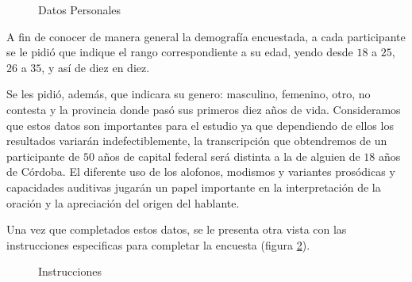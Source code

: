 \begin{figure}[htp]
\begin{center}
\end{center}
\caption{Datos Personales}
\label{personalData}
\end{figure}

A fin de conocer de manera general la demografía encuestada, a cada participante se le pidió que indique el rango correspondiente a su edad, yendo desde $18$ a $25$, $26$ a $35$, y así de diez en diez.

Se les pidió, además, que indicara su genero: masculino, femenino, otro, no contesta y la provincia donde pasó sus primeros diez años de vida. Consideramos que estos datos son importantes para el estudio ya que dependiendo de ellos los resultados variarán indefectiblemente, la transcripción que obtendremos de un participante de $50$ años de capital federal será distinta a la de alguien de $18$ años de Córdoba. El diferente uso de los alofonos, modismos y variantes prosódicas y capacidades auditivas jugarán un papel importante en la interpretación de la oración y la apreciación del origen del hablante.

Una vez que completados estos datos, se le presenta otra vista con las instrucciones especificas para completar la encuesta (figura \ref{instrucciones}).

\begin{figure}
\begin{center}
\end{center}
\caption{Instrucciones}
\label{instrucciones}
\end{figure}

